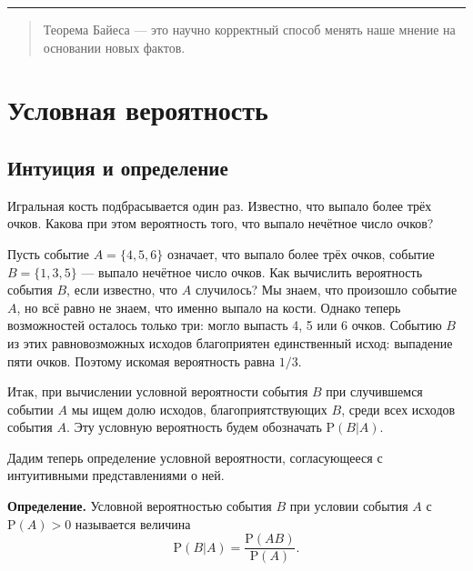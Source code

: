 \documentclass[11pt,a4paper]{article}
\begin{document}
    \begin{center}\rule{0.5\linewidth}{0.5pt}\end{center}

    \begin{quote}
Теорема Байеса --- это научно корректный способ менять наше мнение на
основании новых фактов.
\end{quote}

    \hypertarget{ux443ux441ux43bux43eux432ux43dux430ux44f-ux432ux435ux440ux43eux44fux442ux43dux43eux441ux442ux44c}{%
\section{Условная
вероятность}\label{ux443ux441ux43bux43eux432ux43dux430ux44f-ux432ux435ux440ux43eux44fux442ux43dux43eux441ux442ux44c}}

\hypertarget{ux438ux43dux442ux443ux438ux446ux438ux44f-ux438-ux43eux43fux440ux435ux434ux435ux43bux435ux43dux438ux435}{%
\subsection{Интуиция и
определение}\label{ux438ux43dux442ux443ux438ux446ux438ux44f-ux438-ux43eux43fux440ux435ux434ux435ux43bux435ux43dux438ux435}}

Игральная кость подбрасывается один раз. Известно, что выпало более трёх
очков. Какова при этом вероятность того, что выпало нечётное число
очков?

Пусть событие \(A = \{4, 5, 6\}\) означает, что выпало более трёх очков,
событие \(B = \{1, 3, 5\}\) --- выпало нечётное число очков. Как
вычислить вероятность события \(B\), если известно, что \(A\) случилось?
Мы знаем, что произошло событие \(A\), но всё равно не знаем, что именно
выпало на кости. Однако теперь возможностей осталось только три: могло
выпасть 4, 5 или 6 очков. Событию \(B\) из этих равновозможных исходов
благоприятен единственный исход: выпадение пяти очков. Поэтому искомая
вероятность равна \(1/3\).

Итак, при вычислении условной вероятности события \(B\) при случившемся
событии \(A\) мы ищем долю исходов, благоприятствующих \(B\), среди всех
исходов события \(A\). Эту условную вероятность будем обозначать
\(\mathrm{P}(B|A)\).

Дадим теперь определение условной вероятности, согласующееся с
интуитивными представлениями о ней.

\textbf{Определение.} Условной вероятностью события \(B\) при условии
события \(A\) с \(\mathrm{P}(A)>0\) называется величина
\[ \mathrm{P}(B|A) = \dfrac{\mathrm{P}(AB)}{\mathrm{P}(A)}. \]
\end{document}
